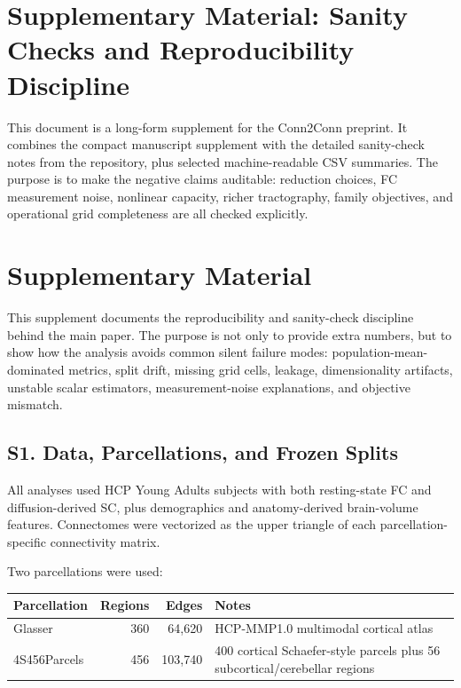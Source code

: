 \section{Supplementary Material: Sanity Checks and Reproducibility Discipline}\label{supplementary-material-sanity-checks-and-reproducibility-discipline}

This document is a long-form supplement for the Conn2Conn preprint. It combines the compact manuscript supplement with the detailed sanity-check notes from the repository, plus selected machine-readable CSV summaries. The purpose is to make the negative claims auditable: reduction choices, FC measurement noise, nonlinear capacity, richer tractography, family objectives, and operational grid completeness are all checked explicitly.

\section{Supplementary Material}\label{supplementary-material}

This supplement documents the reproducibility and sanity-check discipline behind the main paper. The purpose is not only to provide extra numbers, but to show how the analysis avoids common silent failure modes: population-mean-dominated metrics, split drift, missing grid cells, leakage, dimensionality artifacts, unstable scalar estimators, measurement-noise explanations, and objective mismatch.

\subsection{S1. Data, Parcellations, and Frozen Splits}\label{s1-data-parcellations-and-frozen-splits}

All analyses used HCP Young Adults subjects with both resting-state FC and diffusion-derived SC, plus demographics and anatomy-derived brain-volume features. Connectomes were vectorized as the upper triangle of each parcellation-specific connectivity matrix.

Two parcellations were used:

{\def\LTcaptype{none} %
\begin{longtable}[]{@{}lrrl@{}}
\toprule\noalign{}
Parcellation & Regions & Edges & Notes \\
\midrule\noalign{}
\endhead
\bottomrule\noalign{}
\endlastfoot
Glasser & 360 & 64,620 & HCP-MMP1.0 multimodal cortical atlas \\
4S456Parcels & 456 & 103,740 & 400 cortical Schaefer-style parcels plus 56 subcortical/cerebellar regions \\
\end{longtable}
}

